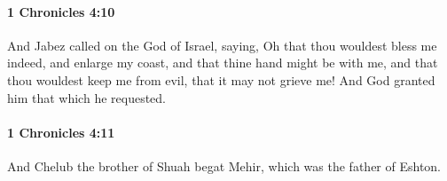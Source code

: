 		\paragraph{1 Chronicles 4:10} %
			\label{1CHRONICLES-4-10}

			And Jabez called on the God of Israel, saying, Oh that thou wouldest bless me indeed, and enlarge my coast, and that thine hand might be with me, and that thou wouldest keep me from evil, that it may not grieve me! And God granted him that which he requested.


		\paragraph{1 Chronicles 4:11} %
			\label{1CHRONICLES-4-11}

			And Chelub the brother of Shuah begat Mehir, which was the father of Eshton.


